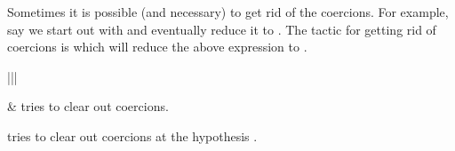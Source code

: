\documentclass[letterpaper,10pt,english]{sphinxmanual}
\begin{document}
\sphinxAtStartPar
Sometimes it is possible (and necessary) to get rid of the coercions.
For example, say we start out with  and eventually reduce it to .
The tactic for getting rid of coercions is  which will reduce the above expression to .


\begin{savenotes}\sphinxattablestart
\centering
\begin{tabular}[t]{|||}
\hline

\sphinxAtStartPar
{}
&
\sphinxAtStartPar
{} tries to clear out coercions.

\sphinxAtStartPar
{} tries to clear out coercions at the hypothesis .
\\
\hline
\end{tabular}
\par
\sphinxattableend\end{savenotes}
\end{document}

